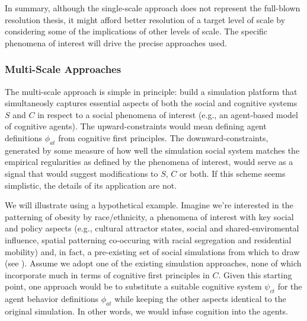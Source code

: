 \documentclass{article}
\begin{document}
  
In summary, although the single-scale approach does not represent the full-blown resolution thesis, it might afford better resolution of a target level of scale by considering some of the implications of other levels of scale. The specific phenomena of interest will drive the precise approaches used.

 \subsubsection{Multi-Scale Approaches}
The multi-scale approach is simple in principle: build a simulation platform that simultaneosly captures essential aspects of both the social and cognitive systems $S$ and $C$ in respect to a social phenomena of interest (e.g., an agent-based model of cognitive agents).  The upward-constraints would mean defining agent definitions $\phi_{at}$ from cognitive first principles. The downward-constraints, generated by some measure of how well the simulation social system matches the empirical regularities as defined by the phenomena of interest, would serve as a signal that would suggest modifications to $S$, $C$ or both.  If this scheme seems simplistic, the details of its application are not. 


We will illustrate using a hypothetical example. Imagine we're interested in the patterning of obesity by race/ethnicity, a phenomena of interest with key social and policy aspects (e.g., cultural attractor states, social and shared-enviromental influence, spatial patterning co-occuring with racial segregation and residential mobility) and, in fact, a pre-existing set of social simulations from which to draw (see \cite{nianogo2015agent}).  Assume we adopt one of the existing simulation approaches, none of which incorporate much in terms of cognitive first principles in $C$.  Given this starting point, one approach would be to substitute a suitable cognitive system $\psi_{ct}$ for the agent behavior definitions $\phi_{at}$  while keeping the other aspects identical to the original simulation. In other words, we would infuse cognition into the agents.  
\end{document}
